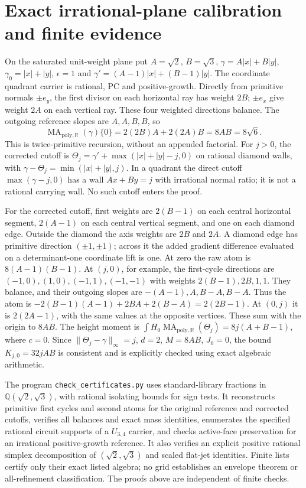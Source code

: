 \documentclass[11pt]{article}
\newcommand{\R}{\mathbb R}
\newcommand{\Q}{\mathbb Q}
\newcommand{\MA}{\operatorname{MA}_{\mathrm{poly},\R}}
\begin{document}
\section{Exact irrational-plane calibration and finite evidence}
On the saturated unit-weight plane put
$A=\sqrt2$, $B=\sqrt3$, $\gamma=A|x|+B|y|$,
$\gamma_0=|x|+|y|$, $\epsilon=1$ and
$\gamma'=(A-1)|x|+(B-1)|y|$.
The coordinate quadrant carrier is rational, PC and positive-growth.
Directly from primitive normals $\pm e_y$, the first divisor on
each horizontal ray has weight $2B$; $\pm e_x$ give weight
$2A$ on each vertical ray. These four weighted directions
balance. The outgoing reference slopes are $A,A,B,B$, so
\[
 \MA(\gamma)\{0\}=2(2B)A+2(2A)B=8AB=8\sqrt6.
\]
This is twice-primitive recursion, without an appended factorial.
For $j>0$, the corrected cutoff is
$\Theta_j=\gamma'+\max(|x|+|y|-j,0)$ on rational diamond walls,
with $\gamma-\Theta_j=\min(|x|+|y|,j)$. In a quadrant the direct
cutoff $\max(\gamma-j,0)$ has a wall $Ax+By=j$ with irrational
normal ratio; it is not a rational carrying wall. No such cutoff
enters the proof.

For the corrected cutoff, first weights are $2(B-1)$ on each
central horizontal segment, $2(A-1)$ on each central vertical
segment, and one on each diamond edge. Outside the diamond
the axis weights are $2B$ and $2A$. A diamond edge has primitive
direction $(\pm1,\pm1)$; across it the added gradient difference
evaluated on a determinant-one coordinate lift is one. At zero
the raw atom is $8(A-1)(B-1)$. At $(j,0)$, for example,
the first-cycle directions are $(-1,0),(1,0),(-1,1),(-1,-1)$
with weights $2(B-1),2B,1,1$. They balance, and their outgoing
slopes are $-(A-1),A,B-A,B-A$. Thus the atom is
$-2(B-1)(A-1)+2BA+2(B-A)=2(2B-1)$.
At $(0,j)$ it is $2(2A-1)$, with the same values at the
opposite vertices. These sum with the origin to $8AB$.
The height moment is
$\int H_0\MA(\Theta_j)=8j(A+B-1)$, where $c=0$.
Since $\|\Theta_j-\gamma\|_\infty=j$, $d=2$, $M=8AB$,
$J_0=0$, the bound $K_{j,0}=32jAB$ is consistent and
is explicitly checked using exact algebraic arithmetic.

The program \texttt{check\_certificates.py} uses standard-library
fractions in $\Q(\sqrt2,\sqrt3)$, with rational isolating bounds
for sign tests. It reconstructs primitive first cycles and second
atoms for the original reference and corrected cutoffs, verifies
all balances and exact mass identities, enumerates the specified
rational circuit supports of a $U_{3,4}$ carrier, and checks
active-face preservation for an irrational positive-growth
reference. It also verifies an explicit positive rational simplex
decomposition of $(\sqrt2,\sqrt3)$ and scaled flat-jet identities.
Finite lists certify only their exact listed algebra; no grid
establishes an envelope theorem or all-refinement classification.
The proofs above are independent of finite checks.
\end{document}
